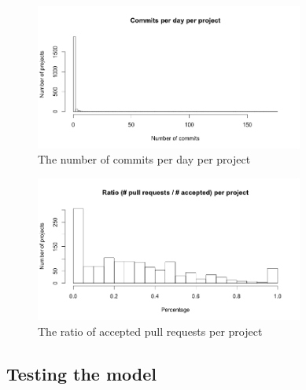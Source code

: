 	    \begin{figure}
	        \includegraphics[width=250pt]{figures/commits-per-day-per-project}
	        \caption{The number of commits per day per project}
	        \label{fig:nr-commits-day-plot}
	    \end{figure}

	    \begin{figure}
	        \includegraphics[width=250pt]{figures/ratio-pull-request-per-project}
	        \caption{The ratio of accepted pull requests per project}
	        \label{fig:ratio-pull-requests-plot}
	    \end{figure}

    
    \subsection{Testing the model}
